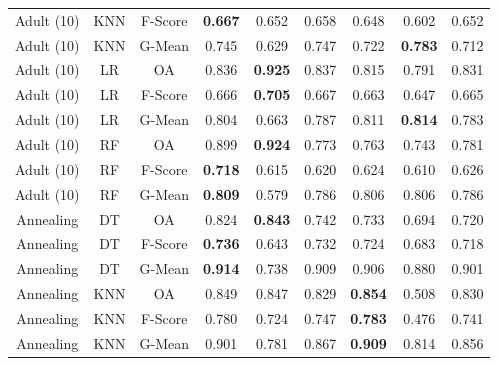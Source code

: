\begin{longtable}{ccccccccc}
        Adult (10) &        KNN & F-Score & \textbf{0.667} &          0.652 &          0.658 &          0.648 &          0.602 &          0.652 \\
        Adult (10) &        KNN &  G-Mean &          0.745 &          0.629 &          0.747 &          0.722 & \textbf{0.783} &          0.712 \\
        Adult (10) &         LR &      OA &          0.836 & \textbf{0.925} &          0.837 &          0.815 &          0.791 &          0.831 \\
        Adult (10) &         LR & F-Score &          0.666 & \textbf{0.705} &          0.667 &          0.663 &          0.647 &          0.665 \\
        Adult (10) &         LR &  G-Mean &          0.804 &          0.663 &          0.787 &          0.811 & \textbf{0.814} &          0.783 \\
        Adult (10) &         RF &      OA &          0.899 & \textbf{0.924} &          0.773 &          0.763 &          0.743 &          0.781 \\
        Adult (10) &         RF & F-Score & \textbf{0.718} &          0.615 &          0.620 &          0.624 &          0.610 &          0.626 \\
        Adult (10) &         RF &  G-Mean & \textbf{0.809} &          0.579 &          0.786 &          0.806 &          0.806 &          0.786 \\
         Annealing &         DT &      OA &          0.824 & \textbf{0.843} &          0.742 &          0.733 &          0.694 &          0.720 \\
         Annealing &         DT & F-Score & \textbf{0.736} &          0.643 &          0.732 &          0.724 &          0.683 &          0.718 \\
         Annealing &         DT &  G-Mean & \textbf{0.914} &          0.738 &          0.909 &          0.906 &          0.880 &          0.901 \\
         Annealing &        KNN &      OA &          0.849 &          0.847 &          0.829 & \textbf{0.854} &          0.508 &          0.830 \\
         Annealing &        KNN & F-Score &          0.780 &          0.724 &          0.747 & \textbf{0.783} &          0.476 &          0.741 \\
         Annealing &        KNN &  G-Mean &          0.901 &          0.781 &          0.867 & \textbf{0.909} &          0.814 &          0.856 \\

\end{longtable}
